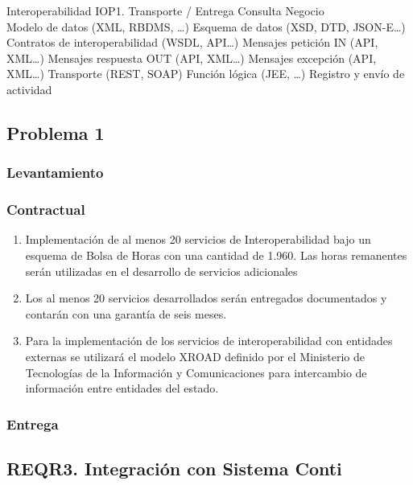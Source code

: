 \documentclass[
  paper=a4,
  ,captions=tableheading
]{scrartcl}
\providecommand{\tightlist}{%
  \setlength{\itemsep}{0pt}\setlength{\parskip}{0pt}}
\begin{document}
Interoperabilidad IOP1. Transporte / Entrega Consulta Negocio\\
Modelo de datos (XML, RBDMS, \ldots) Esquema de datos (XSD, DTD,
JSON-E\ldots) Contratos de interoperabilidad (WSDL, API\ldots) Mensajes
petición IN (API, XML\ldots) Mensajes respuesta OUT (API, XML\ldots)
Mensajes excepción (API, XML\ldots) Transporte (REST, SOAP) Función
lógica (JEE, \ldots) Registro y envío de actividad

\hypertarget{problema-1}{%
\subsection{Problema 1}\label{problema-1}}

\hypertarget{levantamiento}{%
\subsubsection{Levantamiento}\label{levantamiento}}

\hypertarget{contractual}{%
\subsubsection{Contractual}\label{contractual}}

\begin{enumerate}
\def\labelenumi{\arabic{enumi}.}
\tightlist
\item
  Implementación de al menos 20 servicios de Interoperabilidad bajo un
  esquema de Bolsa de Horas con una cantidad de 1.960. Las horas
  remanentes serán utilizadas en el desarrollo de servicios adicionales
\item
  Los al menos 20 servicios desarrollados serán entregados documentados
  y contarán con una garantía de seis meses.
\item
  Para la implementación de los servicios de interoperabilidad con
  entidades externas se utilizará el modelo XROAD definido por el
  Ministerio de Tecnologías de la Información y Comunicaciones para
  intercambio de información entre entidades del estado.
\end{enumerate}

\hypertarget{entrega}{%
\subsubsection{Entrega}\label{entrega}}

\hypertarget{reqr3.-integraciuxf3n-con-sistema-conti}{%
\subsection{REQR3. Integración con Sistema
Conti}\label{reqr3.-integraciuxf3n-con-sistema-conti}}
\end{document}
